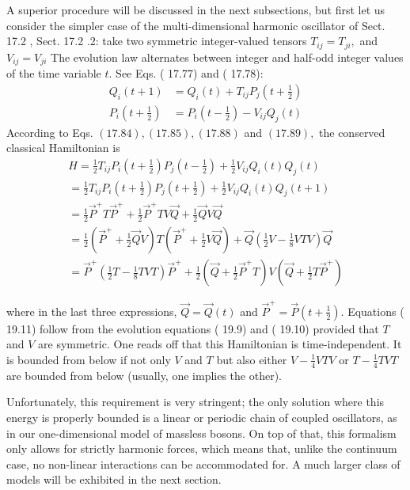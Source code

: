 \documentclass[main.tex]{subfiles}
\begin{document}
A superior procedure will be discussed in the next subsections, but first let us consider the simpler case of the multi-dimensional harmonic oscillator of Sect. 17.2 , Sect. 17.2 .2: take two symmetric integer-valued tensors $T_{i j}=T_{j i},$ and $V_{i j}=V_{j i}$ The evolution law alternates between integer and half-odd integer values of the time variable $t .$ See Eqs. ( 17.77) and ( 17.78):
$$
\begin{aligned}
Q_{i}(t+1) &=Q_{i}(t)+T_{i j} P_{j}\left(t+\frac{1}{2}\right) \\
P_{i}\left(t+\frac{1}{2}\right) &=P_{i}\left(t-\frac{1}{2}\right)-V_{i j} Q_{j}(t)
\end{aligned}
$$
According to Eqs. $(17.84),(17.85),(17.88)$ and $(17.89),$ the conserved classical Hamiltonian is
$$
\begin{array}{l}
{H=\frac{1}{2} T_{i j} P_{i}\left(t+\frac{1}{2}\right) P_{j}\left(t-\frac{1}{2}\right)+\frac{1}{2} V_{i j} Q_{i}(t) Q_{j}(t)} \\
{=\frac{1}{2} T_{i j} P_{i}\left(t+\frac{1}{2}\right) P_{j}\left(t+\frac{1}{2}\right)+\frac{1}{2} V_{i j} Q_{i}(t) Q_{j}(t+1)} \\
{=\frac{1}{2} \vec{P}^{+} T \vec{P}^{+}+\frac{1}{2} \vec{P}^{+} T V \vec{Q}+\frac{1}{2} \vec{Q} V \vec{Q}} \\
{=\frac{1}{2}\left(\vec{P}^{+}+\frac{1}{2} \vec{Q} V\right) T\left(\vec{P}^{+}+\frac{1}{2} V \vec{Q}\right)+\vec{Q}\left(\frac{1}{2} V-\frac{1}{8} V T V\right) \vec{Q}} \\
{=\vec{P}^{+}\left(\frac{1}{2} T-\frac{1}{8} T V T\right) \vec{P}^{+}+\frac{1}{2}\left(\vec{Q}+\frac{1}{2} \vec{P}^{+} T\right) V\left(\vec{Q}+\frac{1}{2} T \vec{P}^{+}\right)}
\end{array}
$$

where in the last three expressions, $\vec{Q}=\vec{Q}(t)$ and $\vec{P}^{+}=\vec{P}\left(t+\frac{1}{2}\right) .$ Equations ( 19.11) follow from the evolution equations ( 19.9) and ( 19.10) provided that
$T$ and $V$ are symmetric. One reads off that this Hamiltonian is time-independent. It is bounded from below if not only $V$ and $T$ but also either $V-\frac{1}{4} V T V$ or $T-\frac{1}{4} T V T$ are bounded from below (usually, one implies the other).

Unfortunately, this requirement is very stringent; the only solution where this energy is properly bounded is a linear or periodic chain of coupled oscillators, as in our one-dimensional model of massless bosons. On top of that, this formalism only allows for strictly harmonic forces, which means that, unlike the continuum case, no non-linear interactions can be accommodated for. A much larger class of models will be exhibited in the next section.
\end{document}

